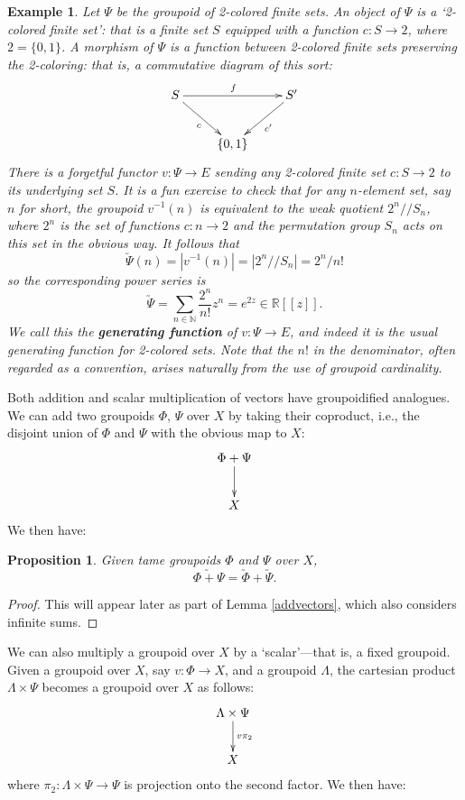 \documentclass{article}
\renewcommand{\to}{\rightarrow}
\newcommand{\maps}{\colon}
\newcommand{\R}{{\mathbb R}}
\newcommand{\N}{{\mathbb N}}
\newtheorem{example}[thm]{Example}
\newtheorem*{proposition*}{Proposition}
\begin{document}
\begin{example}
\label{generating_function}
\textup{
Let $\Psi$ be the groupoid of 2-colored finite sets.  An object of
$\Psi$ is a `2-colored finite set': that is a finite set $S$ equipped
with a function $c: S \to 2$, where $2 = \{0,1\}$.  A morphism of
$\Psi$ is a function between 2-colored finite sets preserving the
2-coloring: that is, a commutative diagram of this sort:
\[
\xymatrix{
& S \ar[dr]_{c} \ar[rr]^{f} && S' \ar[dl]^{c'}  \\
 & & \{0,1\} & & 
}
\]       
There is a forgetful functor $v \maps \Psi \to E$ sending any
2-colored finite set $c \maps S \to 2$ to its underlying set $S$.  It is a
fun exercise to check that for any $n$-element set, say $n$ for short,
the groupoid $v^{-1}(n)$ is equivalent to the weak quotient
$2^n/\!/S_n$, where $2^n$ is the set of functions $c: n \to 2$ and the
permutation group $S_n$ acts on this set in the obvious way.  It follows
that
\[  \utilde{\Psi}(n) = |v^{-1}(n)| = |2^n /\!/ S_n | = 2^n/n! \]
so the corresponding power series is
\[ \utilde{\Psi} = \sum_{n \in \N} \frac{2^n}{n!}z^n = 
e^{2z} \in \R[[z]]. \]
We call this the {\bf generating function} of $v \maps \Psi \to E$,
and indeed it is the usual generating function for 2-colored sets.
Note that the $n!$ in the denominator, often regarded as a convention,
arises naturally from the use of groupoid cardinality.  }
\end{example}

Both addition and scalar multiplication of vectors have groupoidified
analogues.  We can add two groupoids $\Phi$, $\Psi$ over $X$ by taking
their coproduct, i.e., the disjoint union of $\Phi$ and $\Psi$ with
the obvious map to $X$:
\[
\xymatrix{
\Phi + \Psi \ar[d] \\
X
}
\]
We then have:
\begin{proposition*}
Given tame groupoids $\Phi$ and $\Psi$ over $X$,
\[\utilde{\Phi + \Psi} = \utilde{\Phi} + \utilde{\Psi}.\]
\end{proposition*}
\begin{proof}
This will appear later as part of Lemma \ref{addvectors},
which also considers infinite sums.
\end{proof}

We can also multiply a groupoid over $X$ by a `scalar'---that is, a
fixed groupoid.  Given a groupoid over $X$, say $v \maps \Phi\to X$,
and a groupoid $\Lambda$, the cartesian product $\Lambda\times \Psi$
becomes a groupoid over $X$ as follows:
\[\xymatrix{
\Lambda\times \Psi \ar[d]^{v\pi_2}\\ X\\ }\] 
where $\pi_2 \maps \Lambda\times \Psi\to \Psi$ is projection onto the
second factor.  We then have:
\end{document}
